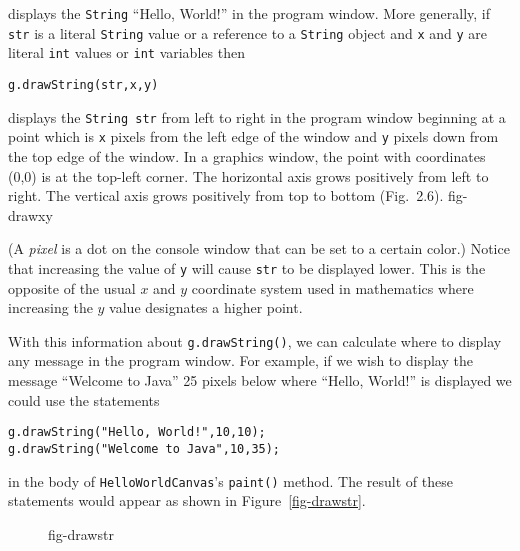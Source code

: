 \noindent displays the {\tt String} ``Hello, World!'' in the program window.  More
generally, if {\tt str} is a literal {\tt String} value or a reference
to a {\tt String} object and {\tt x} and {\tt y} are literal {\tt int}
values or {\tt int} variables then

\begin{jjjlisting}
\begin{lstlisting}  
g.drawString(str,x,y) 
\end{lstlisting}
\end{jjjlisting}

\noindent displays the {\tt String str} from left to right in the program window
beginning at a point which is {\tt x} pixels from the left edge of the
window and {\tt y} pixels down from the top edge of the window. In a
graphics window, the point with coordinates (0,0) is at the top-left
corner. The horizontal axis grows positively from left to right. The
vertical axis grows positively from top to bottom (Fig.~2.6). 
{fig-drawxy}

(A {\em pixel} is a dot on the console window that can be set to a
certain color.)  Notice that increasing the value of {\tt y} will
cause {\tt str} to be displayed lower. This is the opposite of the
usual $x$ and $y$ coordinate system used in mathematics where
increasing the $y$ value designates a higher point.  

With this information about {\tt g.drawString()}, we can calculate
where to display any message in the program window.  For example, if we
wish to display the message ``Welcome to Java'' 25 pixels below where
``Hello, World!'' is displayed we could use the statements

\begin{jjjlisting}
\begin{lstlisting}
g.drawString("Hello, World!",10,10);
g.drawString("Welcome to Java",10,35);
\end{lstlisting}
\end{jjjlisting}

\noindent in the body of {\tt HelloWorldCanvas}'s {\tt paint()} method.  
The result of these statements would appear as shown in
Figure~\ref{fig-drawstr}.

\begin{figure}[h]
\figascaled{chptr02/drawstr.eps}{0.75}{``Hello, World!'' is drawn
at coordinate (10, 10) and ``Welcome to Java'' at
(10, 35) on the JFrame.}
{fig-drawstr}
\end{figure}

